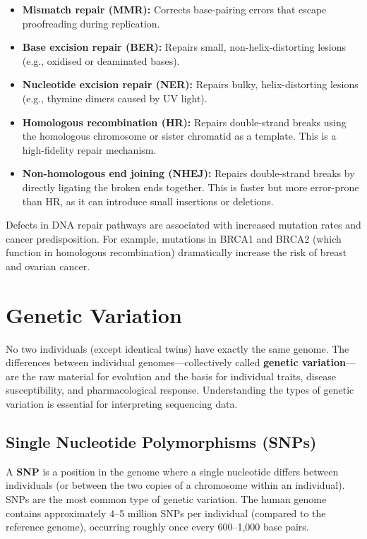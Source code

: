 \begin{itemize}[itemsep=2pt]
  \item \textbf{Mismatch repair (MMR):} Corrects base-pairing errors that escape proofreading during replication.
  \item \textbf{Base excision repair (BER):} Repairs small, non-helix-distorting lesions (e.g., oxidised or deaminated bases).
  \item \textbf{Nucleotide excision repair (NER):} Repairs bulky, helix-distorting lesions (e.g., thymine dimers caused by UV light).
  \item \textbf{Homologous recombination (HR):} Repairs double-strand breaks using the homologous chromosome or sister chromatid as a template. This is a high-fidelity repair mechanism.
  \item \textbf{Non-homologous end joining (NHEJ):} Repairs double-strand breaks by directly ligating the broken ends together. This is faster but more error-prone than HR, as it can introduce small insertions or deletions.
\end{itemize}

Defects in DNA repair pathways are associated with increased mutation rates and cancer predisposition. For example, mutations in BRCA1 and BRCA2 (which function in homologous recombination) dramatically increase the risk of breast and ovarian cancer.


\section{Genetic Variation}
\label{sec:molbio:genetic-variation}

No two individuals (except identical twins) have exactly the same genome. The differences between individual genomes---collectively called \textbf{genetic variation}---are the raw material for evolution and the basis for individual traits, disease susceptibility, and pharmacological response. Understanding the types of genetic variation is essential for interpreting sequencing data.

\subsection{Single Nucleotide Polymorphisms (SNPs)}
\label{subsec:molbio:snps}

A \textbf{\acrfull{SNP}} is a position in the genome where a single nucleotide differs between individuals (or between the two copies of a chromosome within an individual). SNPs are the most common type of genetic variation. The human genome contains approximately 4--5 million SNPs per individual (compared to the reference genome), occurring roughly once every 600--1,000 base pairs.


